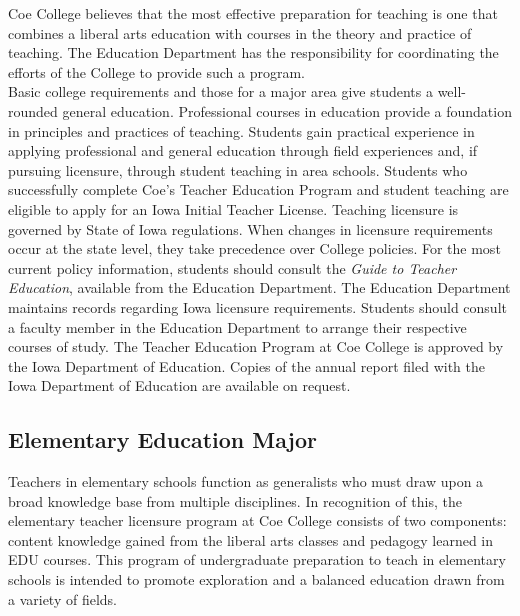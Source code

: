 \documentclass[
  letterpaper,
]{scrbook}
\begin{document}
Coe College believes that the most effective preparation for teaching is
one that combines a liberal arts education with courses in the theory
and practice of teaching. The Education Department has the
responsibility for coordinating the efforts of the College to provide
such a program.\\
Basic college requirements and those for a major area give students a
well-rounded general education. Professional courses in education
provide a foundation in principles and practices of teaching. Students
gain practical experience in applying professional and general education
through field experiences and, if pursuing licensure, through student
teaching in area schools. Students who successfully complete Coe's
Teacher Education Program and student teaching are eligible to apply for
an Iowa Initial Teacher License. Teaching licensure is governed by State
of Iowa regulations. When changes in licensure requirements occur at the
state level, they take precedence over College policies. For the most
current policy information, students should consult the \emph{Guide to
Teacher Education}, available from the Education Department. The
Education Department maintains records regarding Iowa licensure
requirements. Students should consult a faculty member in the Education
Department to arrange their respective courses of study. The Teacher
Education Program at Coe College is approved by the Iowa Department of
Education. Copies of the annual report filed with the Iowa Department of
Education are available on request.

\hypertarget{elementary-education-major}{%
\subsection{Elementary Education
Major}\label{elementary-education-major}}

Teachers in elementary schools function as generalists who must draw
upon a broad knowledge base from multiple disciplines. In recognition of
this, the elementary teacher licensure program at Coe College consists
of two components: content knowledge gained from the liberal arts
classes and pedagogy learned in EDU courses. This program of
undergraduate preparation to teach in elementary schools is intended to
promote exploration and a balanced education drawn from a variety of
fields.
\end{document}
